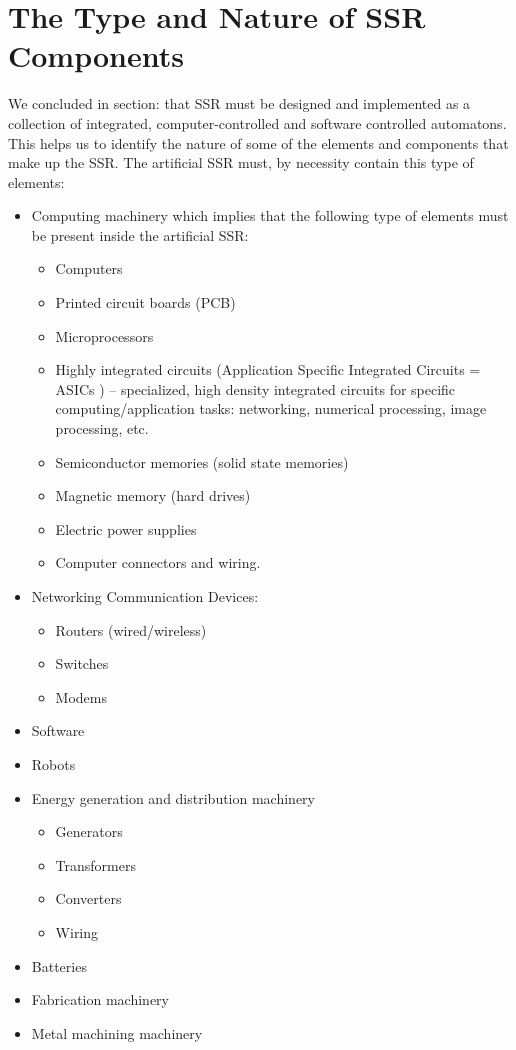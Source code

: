 \section{The Type and Nature of SSR Components}

We concluded in section:   that SSR must be designed and implemented as
a collection of integrated, computer-controlled and software controlled
automatons. This helps us to identify the nature of some of the
elements and components that make up the SSR. The artificial SSR must,
by necessity contain this type of elements:

\begin{itemize}
\item Computing machinery which implies that the following type of
elements must be present inside the artificial SSR:

\begin{itemize}
\item Computers
\item Printed circuit boards (PCB)
\item Microprocessors
\item Highly integrated circuits (Application Specific Integrated
Circuits = ASICs ) – specialized, high density integrated circuits for
specific computing/application tasks: networking, numerical processing,
image processing, etc.
\item Semiconductor memories (solid state memories)
\item Magnetic memory (hard drives)
\item Electric power supplies
\item Computer connectors and wiring.
\end{itemize}
\item Networking Communication Devices:

\begin{itemize}
\item Routers (wired/wireless)
\item Switches
\item Modems
\end{itemize}
\item Software
\item Robots
\item Energy generation and distribution machinery

\begin{itemize}
\item Generators
\item Transformers
\item Converters
\item Wiring
\end{itemize}
\item Batteries
\item Fabrication machinery
\item Metal machining machinery
\end{itemize}

